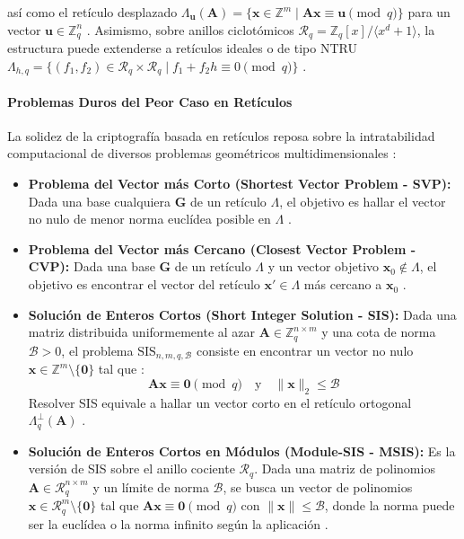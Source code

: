 así como el retículo desplazado $\Lambda_{\mathbf{u}}(\mathbf{A}) = \{ \mathbf{x} \in \mathbb{Z}^m \mid \mathbf{A}\mathbf{x} \equiv \mathbf{u} \pmod q \}$ para un vector $\mathbf{u} \in \mathbb{Z}_q^n$ \cite{an2023secrethandshakes}. Asimismo, sobre anillos ciclotómicos $\mathcal{R}_q = \mathbb{Z}_q[x]/\langle x^d + 1 \rangle$, la estructura puede extenderse a retículos ideales o de tipo NTRU $\Lambda_{h,q} = \{ (f_1, f_2) \in \mathcal{R}_q \times \mathcal{R}_q \mid f_1 + f_2 h \equiv 0 \pmod q \}$ \cite{ma2026laasso}.

\paragraph{Problemas Duros del Peor Caso en Retículos}

La solidez de la criptografía basada en retículos reposa sobre la intratabilidad computacional de diversos problemas geométricos multidimensionales \cite{huang2018lattice, rewal2023quantumsafe, ma2026laasso, an2023secrethandshakes}:

\begin{itemize}
    \item \textbf{Problema del Vector más Corto (Shortest Vector Problem - SVP):} Dada una base cualquiera $\mathbf{G}$ de un retículo $\Lambda$, el objetivo es hallar el vector no nulo de menor norma euclídea posible en $\Lambda$ \cite{huang2018lattice}.

    \item \textbf{Problema del Vector más Cercano (Closest Vector Problem - CVP):} Dada una base $\mathbf{G}$ de un retículo $\Lambda$ y un vector objetivo $\mathbf{x}_0 \notin \Lambda$, el objetivo es encontrar el vector del retículo $\mathbf{x}' \in \Lambda$ más cercano a $\mathbf{x}_0$ \cite{huang2018lattice}.

    \item \textbf{Solución de Enteros Cortos (Short Integer Solution - SIS):} Dada una matriz distribuida uniformemente al azar $\mathbf{A} \in \mathbb{Z}_q^{n \times m}$ y una cota de norma $\mathcal{B} > 0$, el problema $\text{SIS}_{n,m,q,\mathcal{B}}$ consiste en encontrar un vector no nulo $\mathbf{x} \in \mathbb{Z}^m \setminus \{\mathbf{0}\}$ tal que \cite{ma2026laasso, an2023secrethandshakes}:
    \begin{equation}
    \mathbf{A}\mathbf{x} \equiv \mathbf{0} \pmod q \quad \text{y} \quad \|\mathbf{x}\|_2 \le \mathcal{B}
    \end{equation}
    Resolver SIS equivale a hallar un vector corto en el retículo ortogonal $\Lambda_q^\perp(\mathbf{A})$ \cite{an2023secrethandshakes}.

    \item \textbf{Solución de Enteros Cortos en Módulos (Module-SIS - MSIS):} Es la versión de SIS sobre el anillo cociente $\mathcal{R}_q$. Dada una matriz de polinomios $\mathbf{A} \in \mathcal{R}_q^{n \times m}$ y un límite de norma $\mathcal{B}$, se busca un vector de polinomios $\mathbf{x} \in \mathcal{R}_q^m \setminus \{\mathbf{0}\}$ tal que $\mathbf{A}\mathbf{x} \equiv \mathbf{0} \pmod q$ con $\|\mathbf{x}\| \le \mathcal{B}$, donde la norma puede ser la euclídea o la norma infinito según la aplicación \cite{ma2026laasso}.
\end{itemize}

